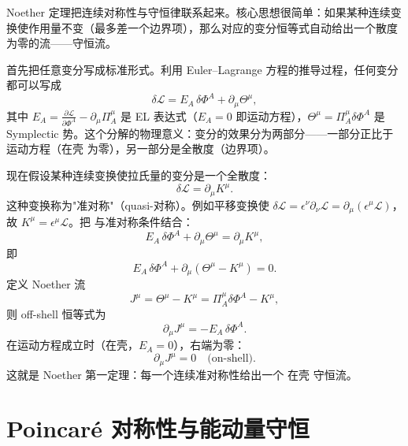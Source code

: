 Noether 定理把连续对称性与守恒律联系起来。核心思想很简单：如果某种连续变换使作用量不变（最多差一个边界项），那么对应的变分恒等式自动给出一个散度为零的流——守恒流。

首先把任意变分写成标准形式。利用 Euler--Lagrange 方程的推导过程，任何变分都可以写成
\begin{equation}\label{eq:ms-poincare-delta-L}
\boxed{
\delta\mathcal{L}=E_A\,\delta\Phi^A+\partial_\mu\Theta^\mu,
}
\end{equation}
其中 $E_A=\frac{\partial\mathcal{L}}{\partial\Phi^A}-\partial_\mu\Pi_A^\mu$ 是 EL 表达式（$E_A=0$ 即运动方程），$\Theta^\mu=\Pi_A^\mu\delta\Phi^A$ 是 Symplectic 势。这个分解的物理意义：变分的效果分为两部分——一部分正比于运动方程（在壳 为零），另一部分是全散度（边界项）。

现在假设某种连续变换使拉氏量的变分是一个全散度：
\begin{equation}
\delta\mathcal{L}=\partial_\mu K^\mu.
\end{equation}
这种变换称为"准对称"（quasi-对称）。例如平移变换使 $\delta\mathcal{L}=\epsilon^\nu\partial_\nu\mathcal{L}=\partial_\mu(\epsilon^\mu\mathcal{L})$，故 $K^\mu=\epsilon^\mu\mathcal{L}$。把 与准对称条件结合：
\begin{equation*}
E_A\,\delta\Phi^A+\partial_\mu\Theta^\mu=\partial_\mu K^\mu,
\end{equation*}
即
\begin{equation*}
E_A\,\delta\Phi^A+\partial_\mu(\Theta^\mu-K^\mu)=0.
\end{equation*}
定义 Noether 流
\begin{equation}\label{eq:ms-poincare-J-def}
\boxed{J^\mu=\Theta^\mu-K^\mu=\Pi_A^\mu\delta\Phi^A-K^\mu,}
\end{equation}
则 off-shell 恒等式为
\begin{equation*}\boxed{\partial_\mu J^\mu=-E_A\,\delta\Phi^A.}
\end{equation*}
在运动方程成立时（在壳，$E_A=0$），右端为零：
\begin{equation}\label{eq:ms-poincare-noether}
\boxed{\partial_\mu J^\mu=0\quad\text{(on-shell)}.}
\end{equation}
这就是 Noether 第一定理：每一个连续准对称性给出一个 在壳 守恒流。

\section{Poincaré 对称性与能动量守恒}

